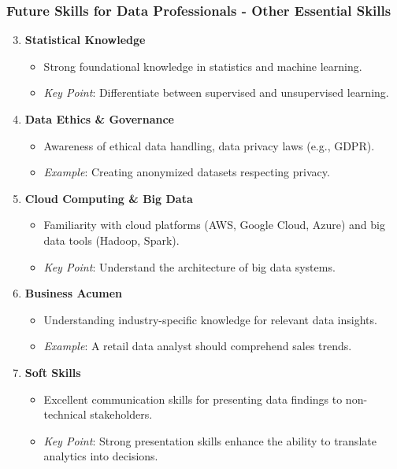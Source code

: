 \documentclass{beamer}
\begin{document}
\begin{frame}[fragile]
    \frametitle{Future Skills for Data Professionals - Other Essential Skills}
    \begin{enumerate}
        \setcounter{enumi}{2}
        \item \textbf{Statistical Knowledge}
            \begin{itemize}
                \item Strong foundational knowledge in statistics and machine learning.
                \item \textit{Key Point}: Differentiate between supervised and unsupervised learning.
            \end{itemize}
        \item \textbf{Data Ethics \& Governance}
            \begin{itemize}
                \item Awareness of ethical data handling, data privacy laws (e.g., GDPR).
                \item \textit{Example}: Creating anonymized datasets respecting privacy.
            \end{itemize}
        \item \textbf{Cloud Computing \& Big Data}
            \begin{itemize}
                \item Familiarity with cloud platforms (AWS, Google Cloud, Azure) and big data tools (Hadoop, Spark).
                \item \textit{Key Point}: Understand the architecture of big data systems.
            \end{itemize}
        \item \textbf{Business Acumen}
            \begin{itemize}
                \item Understanding industry-specific knowledge for relevant data insights.
                \item \textit{Example}: A retail data analyst should comprehend sales trends.
            \end{itemize}
        \item \textbf{Soft Skills}
            \begin{itemize}
                \item Excellent communication skills for presenting data findings to non-technical stakeholders.
                \item \textit{Key Point}: Strong presentation skills enhance the ability to translate analytics into decisions.
            \end{itemize}
    \end{enumerate}
\end{frame}
\end{document}
